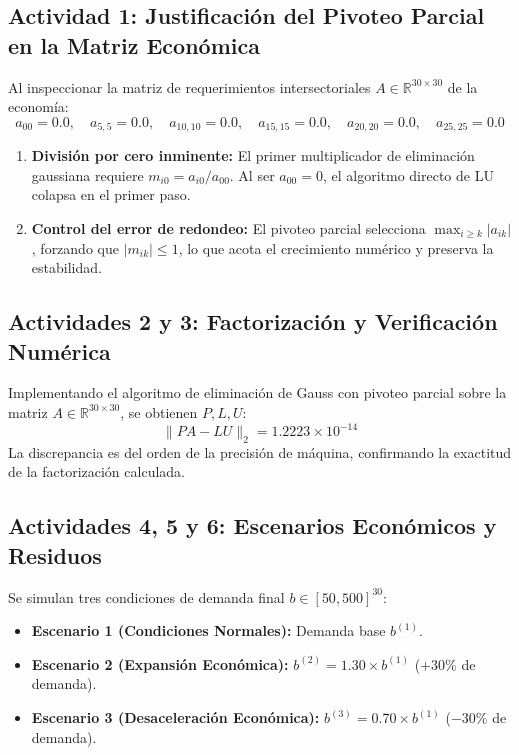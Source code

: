 \documentclass[11pt,a4paper]{article}
\theoremstyle{definition}
\theoremstyle{remark}
\begin{document}
\subsection{Actividad 1: Justificación del Pivoteo Parcial en la Matriz Económica}
Al inspeccionar la matriz de requerimientos intersectoriales $A \in \mathbb{R}^{30 \times 30}$ de la economía:
\begin{equation}
    a_{00} = 0.0, \quad a_{5,5} = 0.0, \quad a_{10,10} = 0.0, \quad a_{15,15} = 0.0, \quad a_{20,20} = 0.0, \quad a_{25,25} = 0.0
\end{equation}
\begin{enumerate}
    \item \textbf{División por cero inminente:} El primer multiplicador de eliminación gaussiana requiere $m_{i0} = a_{i0} / a_{00}$. Al ser $a_{00} = 0$, el algoritmo directo de LU colapsa en el primer paso.
    \item \textbf{Control del error de redondeo:} El pivoteo parcial selecciona $\max_{i \ge k} |a_{ik}|$, forzando que $|m_{ik}| \le 1$, lo que acota el crecimiento numérico y preserva la estabilidad.
\end{enumerate}

\subsection{Actividades 2 y 3: Factorización y Verificación Numérica}
Implementando el algoritmo de eliminación de Gauss con pivoteo parcial sobre la matriz $A \in \mathbb{R}^{30 \times 30}$, se obtienen $P, L, U$:
\begin{equation}
    \|P A - L U\|_2 = 1.2223 \times 10^{-14}
\end{equation}
La discrepancia es del orden de la precisión de máquina, confirmando la exactitud de la factorización calculada.

\subsection{Actividades 4, 5 y 6: Escenarios Económicos y Residuos}
Se simulan tres condiciones de demanda final $b \in [50, 500]^{30}$:
\begin{itemize}[leftmargin=*]
    \item \textbf{Escenario 1 (Condiciones Normales):} Demanda base $b^{(1)}$.
    \item \textbf{Escenario 2 (Expansión Económica):} $b^{(2)} = 1.30 \times b^{(1)}$ ($+30\%$ de demanda).
    \item \textbf{Escenario 3 (Desaceleración Económica):} $b^{(3)} = 0.70 \times b^{(1)}$ ($-30\%$ de demanda).
\end{itemize}
\end{document}
